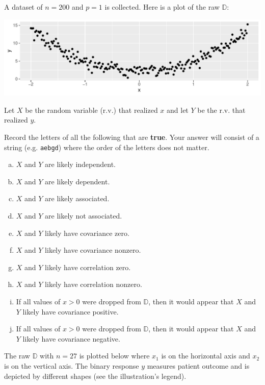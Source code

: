 \documentclass[12pt]{article}
\begin{document}
\problem [7min] A dataset of $n = 200$ and $p=1$ is collected. Here is a plot of the raw $\mathbb{D}$:

\beqn
\centering\includegraphics[width=6in]{parabola.pdf}
\eeqn

\noindent Let $X$ be the random variable (r.v.) that realized $x$ and let $Y$ be the r.v. that realized $y$.

\benum

 Record the letters of all the following that are \textbf{true}. Your answer will consist of a string (e.g. \texttt{aebgd}) where the order of the letters does not matter.

\begin{enumerate}[(a)]
\item $X$ and $Y$ are likely independent.
\item $X$ and $Y$ are likely dependent.
\item $X$ and $Y$ are likely associated.
\item $X$ and $Y$ are likely not associated.
\item $X$ and $Y$ likely have covariance zero.
\item $X$ and $Y$ likely have covariance nonzero.
\item $X$ and $Y$ likely have correlation zero.
\item $X$ and $Y$ likely have correlation nonzero.
\item If all values of $x > 0$ were dropped from $\mathbb{D}$, then it would appear that $X$ and $Y$ likely have covariance positive.
\item If all values of $x > 0$ were dropped from $\mathbb{D}$, then it would appear that $X$ and $Y$ likely have covariance negative.
\end{enumerate}
\eenum\pagebreak

\problem [13min] The raw $\mathbb{D}$ with $n = 27$ is plotted below where $x_1$ is on the horizontal axis and $x_2$ is on the vertical axis. The binary response $y$ measures patient outcome and is depicted by different shapes (see the illustration's legend).
\end{document}
